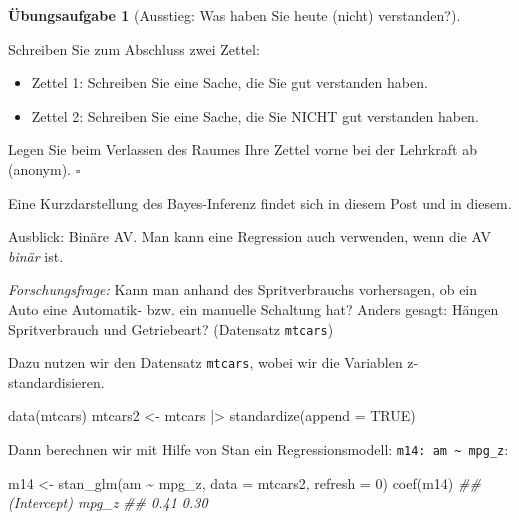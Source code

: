 \documentclass[
  ngerman,
  letterpaper,
  twoside,
  open=any]{scrbook}
\newenvironment{Shaded}{\begin{snugshade}}{\end{snugshade}}
\newcommand{\AttributeTok}[1]{\textcolor[rgb]{0.40,0.45,0.13}{#1}}
\newcommand{\ConstantTok}[1]{\textcolor[rgb]{0.56,0.35,0.01}{#1}}
\newcommand{\DecValTok}[1]{\textcolor[rgb]{0.68,0.00,0.00}{#1}}
\newcommand{\DocumentationTok}[1]{\textcolor[rgb]{0.37,0.37,0.37}{\textit{#1}}}
\newcommand{\FunctionTok}[1]{\textcolor[rgb]{0.28,0.35,0.67}{#1}}
\newcommand{\NormalTok}[1]{\textcolor[rgb]{0.00,0.23,0.31}{#1}}
\newcommand{\OtherTok}[1]{\textcolor[rgb]{0.00,0.23,0.31}{#1}}
\newcommand{\SpecialCharTok}[1]{\textcolor[rgb]{0.37,0.37,0.37}{#1}}
\providecommand{\tightlist}{%
  \setlength{\itemsep}{0pt}\setlength{\parskip}{0pt}}\usepackage{longtable,booktabs,array}
\theoremstyle{definition}
\theoremstyle{plain}
\theoremstyle{definition}
\newtheorem{exercise}{Übungsaufgabe}[chapter]
\theoremstyle{definition}
\theoremstyle{definition}
\theoremstyle{definition}
\newtheorem{exercise}{Übungsaufgabe}[chapter]
\theoremstyle{remark}
\begin{document}
\begin{exercise}[Ausstieg: Was haben Sie heute (nicht)
verstanden?]\protect\hypertarget{exr-ausstieg-fallbsps}{}\label{exr-ausstieg-fallbsps}

Schreiben Sie zum Abschluss zwei Zettel:

\begin{itemize}
\tightlist
\item
  Zettel 1: Schreiben Sie eine Sache, die Sie gut verstanden haben.
\item
  Zettel 2: Schreiben Sie eine Sache, die Sie NICHT gut verstanden
  haben.
\end{itemize}

Legen Sie beim Verlassen des Raumes Ihre Zettel vorne bei der Lehrkraft
ab (anonym). \(\square\)

\end{exercise}

Eine Kurzdarstellung des Bayes-Inferenz findet sich in diesem Post und
in diesem.

Ausblick: Binäre AV. Man kann eine Regression auch verwenden, wenn die
AV \emph{binär} ist.

\begin{displayquote}
\emph{Forschungsfrage:} Kann man anhand des Spritverbrauchs vorhersagen,
ob ein Auto eine Automatik- bzw. ein manuelle Schaltung hat? Anders
gesagt: Hängen Spritverbrauch und Getriebeart? (Datensatz
\texttt{mtcars})
\end{displayquote}

Dazu nutzen wir den Datensatz \texttt{mtcars}, wobei wir die Variablen
z-standardisieren.

\begin{Shaded}
\begin{Highlighting}[]
\FunctionTok{data}\NormalTok{(mtcars)}
\NormalTok{mtcars2 }\OtherTok{\textless{}{-}}
\NormalTok{  mtcars }\SpecialCharTok{|\textgreater{}} 
  \FunctionTok{standardize}\NormalTok{(}\AttributeTok{append =} \ConstantTok{TRUE}\NormalTok{)}
\end{Highlighting}
\end{Shaded}

Dann berechnen wir mit Hilfe von Stan ein Regressionsmodell:
\texttt{m14:\ am\ \textasciitilde{}\ mpg\_z}:

\begin{Shaded}
\begin{Highlighting}[]
\NormalTok{m14 }\OtherTok{\textless{}{-}}
  \FunctionTok{stan\_glm}\NormalTok{(am }\SpecialCharTok{\textasciitilde{}}\NormalTok{ mpg\_z, }
           \AttributeTok{data =}\NormalTok{ mtcars2, }
           \AttributeTok{refresh =} \DecValTok{0}\NormalTok{)}
\FunctionTok{coef}\NormalTok{(m14)}
\DocumentationTok{\#\# (Intercept)       mpg\_z }
\DocumentationTok{\#\#        0.41        0.30}
\end{Highlighting}
\end{Shaded}
\end{document}
